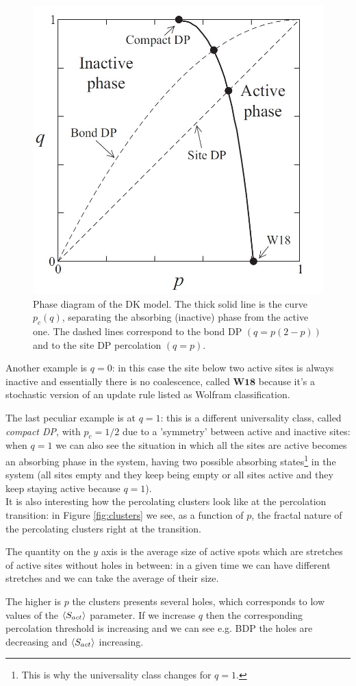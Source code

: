\documentclass[\main/main.tex]{subfiles}
\begin{document}
\begin{figure}[ht]
    \centering
    \includegraphics[width=0.5\linewidth]{Lectures/Images/phase_diag.jpg}
    \caption{Phase diagram of the DK model. The thick solid line is the curve $p_c(q)$, separating the absorbing (inactive) phase from
the active one. The dashed lines correspond to the bond DP $(q = p(2 - p))$ and to the site DP percolation $(q = p)$.}
    \label{fig:phase}
\end{figure}

Another example is $q=0$: in this case the site below two active sites is always inactive and essentially there is no coalescence, called $\mathbf{W18}$ because it's a stochastic version of an update rule listed as Wolfram classification.

The last peculiar example is at $q=1$: this is a different universality class, called \textit{compact DP}, with $p_c=1/2$ due to a 'symmetry' between active and inactive sites: when $q=1$ we can also see the situation in which all the sites are active becomes an absorbing phase in the system, having two possible absorbing states\footnote{This is why the universality class changes for $q=1$.} in the system (all sites empty and they keep being empty or all sites active and they keep staying active because $q=1$). \\

It is also interesting how the percolating clusters look like at the percolation transition: in Figure \ref{fig:clusters} we see, as a function of $p$, the fractal nature of the percolating clusters right at the transition.

The quantity on the $y$ axis is the average size of active spots which are stretches of active sites without holes in between: in a given time we can have different stretches and we can take the average of their size.

The higher is $p$ the clusters presents several holes, which corresponds to low values of the $\left\langle S_{act} \right\rangle$ parameter. If we increase $q$ then the corresponding percolation threshold is increasing and we can see e.g. BDP the holes are decreasing and $\left\langle S_{act} \right\rangle$ increasing.
\end{document}
